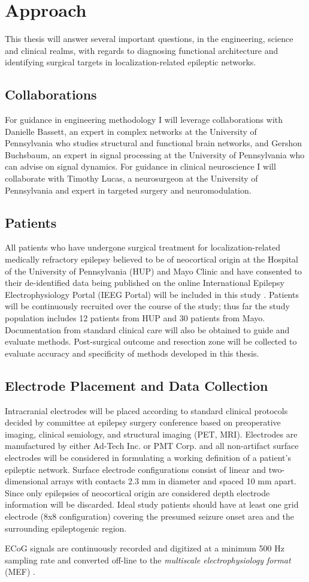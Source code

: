 \section{Approach}
This thesis will answer several important questions, in the engineering, science and clinical realms, with regards to diagnosing functional architecture and identifying surgical targets in localization-related epileptic networks.

\subsection{Collaborations}
\label{subsec:collaborations}
For guidance in engineering methodology I will leverage collaborations with Danielle Bassett, an expert in complex networks at the University of Pennsylvania who studies structural and functional brain networks, and Gershon Buchsbaum, an expert in signal processing at the University of Pennsylvania who can advise on signal dynamics. For guidance in clinical neuroscience I will collaborate with Timothy Lucas, a neurosurgeon at the University of Pennsylvania and expert in targeted surgery and neuromodulation.

\subsection{Patients}
\label{subsec:patients}
All patients who have undergone surgical treatment for localization-related medically refractory epilepsy believed to be of neocortical origin at the Hospital of the University of Pennsylvania (HUP) and Mayo Clinic and have consented to their de-identified data being published on the online International Epilepsy Electrophysiology Portal (IEEG Portal) will be included in this study \cite{wagenaar2013multimodal}. Patients will be continuously recruited over the course of the study; thus far the study population includes 12 patients from HUP and 30 patients from Mayo. Documentation from standard clinical care will also be obtained to guide and evaluate methods. Post-surgical outcome and resection zone will be collected to evaluate accuracy and specificity of methods developed in this thesis.

\subsection{Electrode Placement and Data Collection}
\label{subsec:elecdata}
Intracranial electrodes will be placed according to standard clinical protocols decided by committee at epilepsy surgery conference based on preoperative imaging, clinical semiology, and structural imaging (PET, MRI). Electrodes are manufactured by either Ad-Tech Inc. or PMT Corp. and all non-artifact surface electrodes will be considered in formulating a working definition of a patient's epileptic network. Surface electrode configurations consist of linear and two-dimensional arrays with contacts 2.3 mm in diameter and spaced 10 mm apart. Since only epilepsies of neocortical origin are considered depth electrode information will be discarded. Ideal study patients should have at least one grid electrode (8x8 configuration) covering the presumed seizure onset area and the surrounding epileptogenic region.

ECoG signals are continuously recorded and digitized at a minimum 500 Hz sampling rate and converted off-line to the \textit{multiscale electrophysiology format} (MEF) \cite{brinkmann2009large-scale}.
